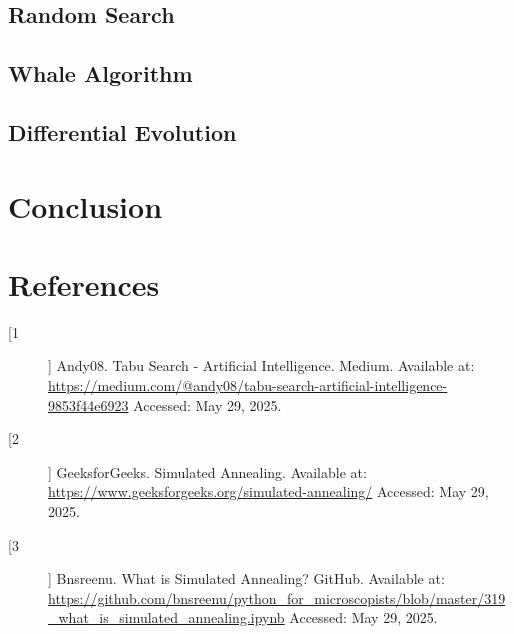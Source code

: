 \documentclass{report}
\begin{document}
\subsection*{Random Search}
\subsection*{Whale Algorithm}
\subsection*{Differential Evolution}

\section*{Conclusion}

\section*{References}

\begin{description}
  \item[[1]] Andy08. Tabu Search - Artificial Intelligence. Medium. Available at: \url{https://medium.com/@andy08/tabu-search-artificial-intelligence-9853f44e6923} Accessed: May 29, 2025.

  \item[[2]] GeeksforGeeks. Simulated Annealing. Available at: \url{https://www.geeksforgeeks.org/simulated-annealing/} Accessed: May 29, 2025.

  \item[[3]] Bnsreenu. What is Simulated Annealing? GitHub. Available at: \url{https://github.com/bnsreenu/python_for_microscopists/blob/master/319_what_is_simulated_annealing.ipynb} Accessed: May 29, 2025.
\end{description}
\end{document}
